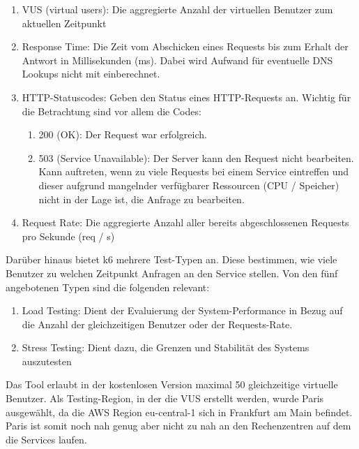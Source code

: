 \begin{enumerate}
    \item VUS (virtual users): Die aggregierte Anzahl der virtuellen Benutzer zum aktuellen Zeitpunkt 
    
    \item Response Time: Die Zeit vom Abschicken eines Requests bis zum Erhalt der Antwort in Millisekunden (ms). Dabei wird Aufwand für eventuelle DNS Lookups nicht mit einberechnet.
    
    \item HTTP-Statuscodes: Geben den Status eines HTTP-Requests an. Wichtig für die Betrachtung sind vor allem die Codes:
        \begin{enumerate}
            \item 200 (OK): Der Request war erfolgreich.
            \item 503 (Service Unavailable): Der Server kann den Request nicht bearbeiten. Kann auftreten, wenn zu viele Requests bei einem Service eintreffen und dieser aufgrund mangelnder verfügbarer Ressourcen (CPU / Speicher) nicht in der Lage ist, die Anfrage zu bearbeiten.
        \end{enumerate}
        
    \item Request Rate: Die aggregierte Anzahl aller bereits abgeschlossenen Requests pro Sekunde (req / s)
\end{enumerate}

Darüber hinaus bietet k6 mehrere Test-Typen an. Diese bestimmen, wie viele Benutzer zu welchen Zeitpunkt Anfragen an den Service stellen. Von den fünf angebotenen Typen sind die folgenden relevant:
\begin{enumerate}
    \item Load Testing: Dient der Evaluierung der System-Performance in Bezug auf die Anzahl der gleichzeitigen Benutzer oder der Requests-Rate.
    
    \item Stress Testing: Dient dazu, die Grenzen und Stabilität des Systems auszutesten
\end{enumerate}


Das Tool erlaubt in der kostenlosen Version maximal 50 gleichzeitige virtuelle Benutzer. Als Testing-Region, in der die VUS erstellt werden, wurde Paris ausgewählt, da die AWS Region eu-central-1 sich in Frankfurt am Main befindet. Paris ist somit noch nah genug aber nicht zu nah an den Rechenzentren auf dem die Services laufen.

